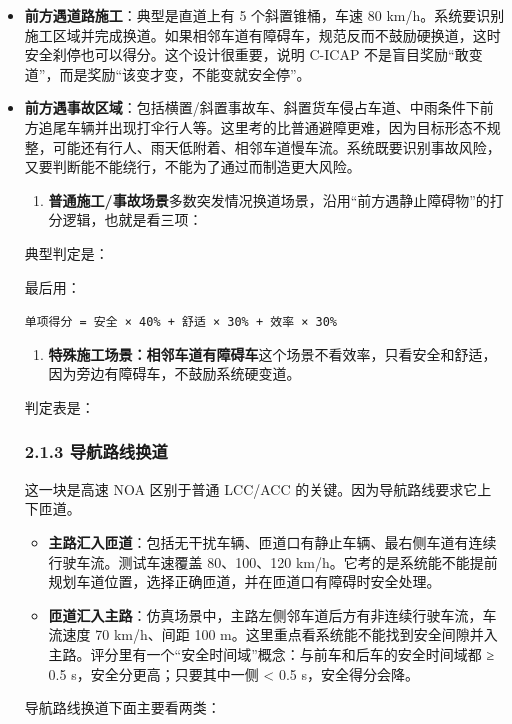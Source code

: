 \begin{itemize}
  \item \textbf{前方遇道路施工}：典型是直道上有 5 个斜置锥桶，车速 80 km/h。系统要识别施工区域并完成换道。如果相邻车道有障碍车，规范反而不鼓励硬换道，这时安全刹停也可以得分。这个设计很重要，说明 C-ICAP 不是盲目奖励“敢变道”，而是奖励“该变才变，不能变就安全停”。
  \item \textbf{前方遇事故区域}：包括横置/斜置事故车、斜置货车侵占车道、中雨条件下前方追尾车辆并出现打伞行人等。这里考的比普通避障更难，因为目标形态不规整，可能还有行人、雨天低附着、相邻车道慢车流。系统既要识别事故风险，又要判断能不能绕行，不能为了通过而制造更大风险。
\begin{enumerate}
  \item \textbf{普通施工/事故场景}多数突发情况换道场景，沿用“前方遇静止障碍物”的打分逻辑，也就是看三项：
\end{enumerate}

典型判定是：

最后用：

\texttt{单项得分 = 安全 × 40\% + 舒适 × 30\% + 效率 × 30\%}

\begin{enumerate}
  \item \textbf{特殊施工场景：相邻车道有障碍车}这个场景不看效率，只看安全和舒适，因为旁边有障碍车，不鼓励系统硬变道。
\end{enumerate}

判定表是：

\subsubsection{2.1.3 导航路线换道}

这一块是高速 NOA 区别于普通 LCC/ACC 的关键。因为导航路线要求它上下匝道。

\begin{itemize}
  \item \textbf{主路汇入匝道}：包括无干扰车辆、匝道口有静止车辆、最右侧车道有连续行驶车流。测试车速覆盖 80、100、120 km/h。它考的是系统能不能提前规划车道位置，选择正确匝道，并在匝道口有障碍时安全处理。
  \item \textbf{匝道汇入主路}：仿真场景中，主路左侧邻车道后方有非连续行驶车流，车流速度 70 km/h、间距 100 m。这里重点看系统能不能找到安全间隙并入主路。评分里有一个“安全时间域”概念：与前车和后车的安全时间域都 ≥ 0.5 s，安全分更高；只要其中一侧 < 0.5 s，安全得分会降。
\end{itemize}

导航路线换道下面主要看两类：


\end{itemize}
